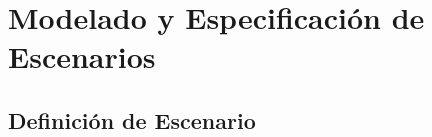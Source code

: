 \documentclass[handout,slidestop,xcolor=pst,dvips,blue]{beamer}
\begin{document}
%
%
%
%
%
%

\section{Modelado y Especificación de Escenarios}

\subsection{Definición de Escenario}
\end{document}
